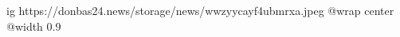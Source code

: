  
 
 
 
 

\ifcmt
  ig https://donbas24.news/storage/news/wwzyycayf4ubmrxa.jpeg
  @wrap center
  @width 0.9
\fi

